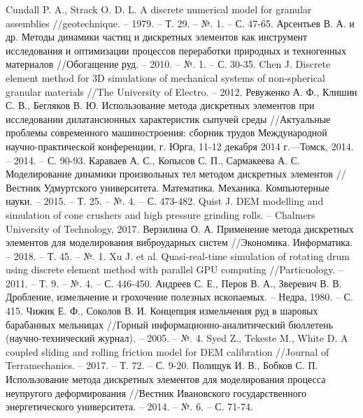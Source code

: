\documentclass[utf8x, 14pt, oneside, a4paper]{article}
\begin{document}
		\pagebreak

		
\begin{thebibliography}{99}
 Cundall P. A., Strack O. D. L. A discrete numerical model for granular assemblies //geotechnique. – 1979. – Т. 29. – №. 1. – С. 47-65.
 Арсентьев В. А. и др. Методы динамики частиц и дискретных элементов как инструмент исследования и оптимизации процессов переработки природных и техногенных материалов //Обогащение руд. – 2010. – №. 1. – С. 30-35.
 Chen J. Discrete element method for 3D simulations of mechanical systems of non-spherical granular materials //The University of Electro. – 2012.
 Ревуженко А. Ф., Клишин С. В., Бегляков В. Ю. Использование метода дискретных элементов при исследовании дилатансионных характеристик сыпучей среды //Актуальные проблемы современного машиностроения: сборник трудов Международной научно-практической конференции, г. Юрга, 11-12 декабря 2014 г.—Томск, 2014. – 2014. – С. 90-93.
 Караваев А. С., Копысов С. П., Сармакеева А. С. Моделирование динамики произвольных тел методом дискретных элементов //Вестник Удмуртского университета. Математика. Механика. Компьютерные науки. – 2015. – Т. 25. – №. 4. – С. 473-482.
 Quist J. DEM modelling and simulation of cone crushers and high pressure grinding rolls. – Chalmers University of Technology, 2017.
 Верзилина О. А. Применение метода дискретных элементов для моделирования виброударных систем //Экономика. Информатика. – 2018. – Т. 45. – №. 1.
 Xu J. et al. Quasi-real-time simulation of rotating drum using discrete element method with parallel GPU computing //Particuology. – 2011. – Т. 9. – №. 4. – С. 446-450.
 Андреев С. Е., Перов В. А., Зверевич В. В. Дробление, измельчение и грохочение полезных ископаемых. – Недра, 1980. – С. 415.
 Чижик Е. Ф., Соколов В. И. Концепция измельчения руд в шаровых барабанных мельницах //Горный информационно-аналитический бюллетень (научно-технический журнал). – 2005. – №. 4.
 Syed Z., Tekeste M., White D. A coupled sliding and rolling friction model for DEM calibration //Journal of Terramechanics. – 2017. – Т. 72. – С. 9-20.
 Полищук И. В., Бобков С. П. Использование метода дискретных элементов для моделирования процесса неупругого деформирования //Вестник Ивановского государственного энергетического университета. – 2014. – №. 6. – С. 71-74.

\end{thebibliography}
\end{document}
